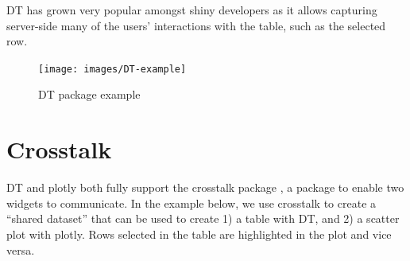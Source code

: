\documentclass[10pt,]{krantz}
\makeatletter
\newenvironment{Shaded}{\begin{snugshade}}{\end{snugshade}}
\newcommand{\ControlFlowTok}[1]{\textcolor[rgb]{0.27,0.27,0.27}{\textbf{#1}}}
\newcommand{\DecValTok}[1]{\textcolor[rgb]{0.06,0.06,0.06}{#1}}
\newcommand{\KeywordTok}[1]{\textcolor[rgb]{0.27,0.27,0.27}{\textbf{#1}}}
\newcommand{\NormalTok}[1]{#1}
\newcommand{\OperatorTok}[1]{\textcolor[rgb]{0.43,0.43,0.43}{\textbf{#1}}}
\newcommand{\StringTok}[1]{\textcolor[rgb]{0.5,0.5,0.5}{#1}}
\newenvironment{kframe}{%
\medskip{}
\setlength{\fboxsep}{.8em}
 \def\at@end@of@kframe{}%
 \ifinner\ifhmode%
  \def\at@end@of@kframe{\end{minipage}}%
  \begin{minipage}{\columnwidth}%
 \fi\fi%
 \def\FrameCommand##1{\hskip\@totalleftmargin \hskip-\fboxsep
 \colorbox{shadecolor}{##1}\hskip-\fboxsep
     \hskip-\linewidth \hskip-\@totalleftmargin \hskip\columnwidth}%
 \MakeFramed {\advance\hsize-\width
   \@totalleftmargin\z@ \linewidth\hsize
   \@setminipage}}%
 {\par\unskip\endMakeFramed%
 \at@end@of@kframe}
\renewenvironment{Shaded}{\begin{kframe}}{\end{kframe}}
\makeatother
\begin{document}
DT has grown very popular amongst shiny developers as it allows capturing server-side many of the users' interactions with the table, such as the selected row.

\begin{Shaded}
\end{Shaded}

\begin{figure}[H]

{\centering \texttt{[image: images/DT-example]} 

}

\caption{DT package example}\label{fig:dt-example}
\end{figure}

\hypertarget{widgets-intro-crosstalk}{%
\section{Crosstalk}\label{widgets-intro-crosstalk}}

DT and plotly both fully support the crosstalk package \citep{R-crosstalk}, a package to enable two widgets to communicate. In the example below, we use crosstalk to create a ``shared dataset'' that can be used to create 1) a table with DT, and 2) a scatter plot with plotly. Rows selected in the table are highlighted in the plot and vice versa.
\end{document}
